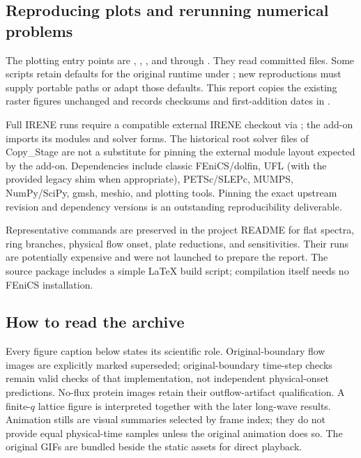 \subsection{Reproducing plots and rerunning numerical problems}
The plotting entry points are , , , and  through . They read committed  files. Some scripts retain defaults for the original runtime under ; new reproductions must supply portable paths or adapt those defaults. This report copies the existing raster figures unchanged and records checksums and first-addition dates in .

Full IRENE runs require a compatible external IRENE checkout via ; the add-on imports its modules and solver forms. The historical root solver files of Copy\_Stage are not a substitute for pinning the external module layout expected by the add-on. Dependencies include classic FEniCS/dolfin, UFL (with the provided legacy shim when appropriate), PETSc/SLEPc, MUMPS, NumPy/SciPy, gmsh, meshio, and plotting tools. Pinning the exact upstream revision and dependency versions is an outstanding reproducibility deliverable.

Representative commands are preserved in the project README for flat spectra, ring branches, physical flow onset, plate reductions, and sensitivities. Their runs are potentially expensive and were not launched to prepare the report. The source package includes a simple LaTeX build script; compilation itself needs no FEniCS installation.

\subsection{How to read the archive}
Every figure caption below states its scientific role. Original-boundary flow images are explicitly marked superseded; original-boundary time-step checks remain valid checks of that implementation, not independent physical-onset predictions. No-flux protein images retain their outflow-artifact qualification. A finite-$q$ lattice figure is interpreted together with the later long-wave results. Animation stills are visual summaries selected by frame index; they do not provide equal physical-time samples unless the original animation does so. The original GIFs are bundled beside the static assets for direct playback.

